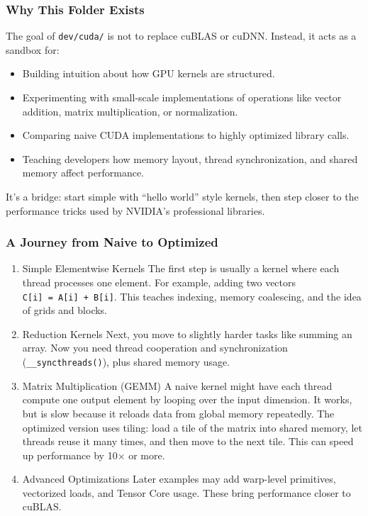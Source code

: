 \documentclass[
  letterpaper,
  DIV=11,
  numbers=noendperiod]{scrreprt}
\providecommand{\tightlist}{%
  \setlength{\itemsep}{0pt}\setlength{\parskip}{0pt}}
\begin{document}
\subsubsection{Why This Folder Exists}\label{why-this-folder-exists}

The goal of \texttt{dev/cuda/} is not to replace cuBLAS or cuDNN.
Instead, it acts as a sandbox for:

\begin{itemize}
\tightlist
\item
  Building intuition about how GPU kernels are structured.
\item
  Experimenting with small-scale implementations of operations like
  vector addition, matrix multiplication, or normalization.
\item
  Comparing naive CUDA implementations to highly optimized library
  calls.
\item
  Teaching developers how memory layout, thread synchronization, and
  shared memory affect performance.
\end{itemize}

It's a bridge: start simple with ``hello world'' style kernels, then
step closer to the performance tricks used by NVIDIA's professional
libraries.

\subsubsection{A Journey from Naive to
Optimized}\label{a-journey-from-naive-to-optimized}

\begin{enumerate}
\def\labelenumi{\arabic{enumi}.}
\item
  Simple Elementwise Kernels The first step is usually a kernel where
  each thread processes one element. For example, adding two vectors
  \texttt{C{[}i{]}\ =\ A{[}i{]}\ +\ B{[}i{]}}. This teaches indexing,
  memory coalescing, and the idea of grids and blocks.
\item
  Reduction Kernels Next, you move to slightly harder tasks like summing
  an array. Now you need thread cooperation and synchronization
  (\texttt{\_\_syncthreads()}), plus shared memory usage.
\item
  Matrix Multiplication (GEMM) A naive kernel might have each thread
  compute one output element by looping over the input dimension. It
  works, but is slow because it reloads data from global memory
  repeatedly. The optimized version uses tiling: load a tile of the
  matrix into shared memory, let threads reuse it many times, and then
  move to the next tile. This can speed up performance by 10× or more.
\item
  Advanced Optimizations Later examples may add warp-level primitives,
  vectorized loads, and Tensor Core usage. These bring performance
  closer to cuBLAS.
\end{enumerate}
\end{document}
